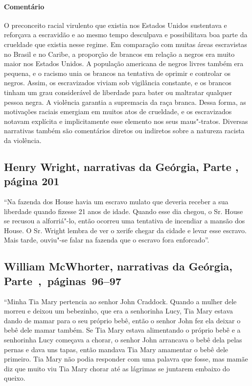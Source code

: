 \paragraph{Comentário}\quad
{\small
O preconceito racial virulento que existia nos Estados Unidos
sustentava e reforçava a escravidão e ao mesmo tempo desculpava e
possibilitava boa parte da crueldade que existia nesse regime. Em
comparação com muitas áreas escravistas no Brasil e no Caribe, a
proporção de brancos em relação a negros era muito maior nos Estados
Unidos. A população americana de negros livres também era pequena, e o
racismo unia os brancos na tentativa de oprimir e controlar os negros.
Assim, os escravizados viviam sob vigilância constante, e os brancos tinham
um grau considerável de liberdade para bater ou maltratar qualquer
pessoa negra. A violência garantia a supremacia da raça branca. Dessa
forma, as motivações raciais emergiam em muitos atos de crueldade, e os
escravizados notavam explícita e implicitamente esse elemento nos seus
maus"-tratos. Diversas narrativas também são comentários diretos ou
indiretos sobre a natureza racista da violência.
}

\subsection{Henry Wright, narrativas da Geórgia, Parte , página 201}
\label{ref318}

``Na fazenda dos House havia um escravo mulato que deveria receber a sua
liberdade quando fizesse 21 anos de idade. Quando esse dia chegou, o Sr.
House se recusou a alforriá"-lo, então ocorreu uma tentativa de incendiar
a mansão dos House. O Sr. Wright lembra de ver o xerife chegar da cidade
e levar esse escravo. Mais tarde, ouviu"-se falar na fazenda que o
escravo fora enforcado''.

\subsection{William McWhorter, narrativas da Geórgia, Parte~,~páginas~96--97}
\label{ref189}

``Minha Tia Mary pertencia ao senhor John Craddock. Quando a mulher dele
morreu e deixou um bebezinho, que era a senhorinha Lucy, Tia Mary estava
dando de mamar para o seu próprio bebê, então o senhor John fez ela
deixar o bebê dele mamar também. Se Tia Mary estava alimentando o
próprio bebê e a senhorinha Lucy começava a chorar, o senhor John
arrancava o bebê dela pelas pernas e dava uns tapas, então mandava Tia
Mary amamentar o bebê dele primeiro. Tia Mary não podia responder com
uma palavra que fosse, mas mamãe diz que muito viu Tia Mary chorar até
as lágrimas se juntarem embaixo do queixo.

